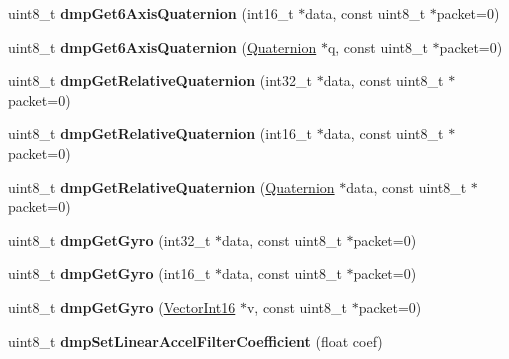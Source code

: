 \begin{DoxyCompactItemize}
\mbox{\label{classMPU6050_a9c074fce94329c3f41aa6cddc2080358}} 
uint8\+\_\+t {\bfseries dmp\+Get6\+Axis\+Quaternion} (int16\+\_\+t $\ast$data, const uint8\+\_\+t $\ast$packet=0)
\item 
\mbox{\label{classMPU6050_a2fff9f9904645926472a7527b20d2330}} 
uint8\+\_\+t {\bfseries dmp\+Get6\+Axis\+Quaternion} (\mbox{\hyperlink{classQuaternion}{Quaternion}} $\ast$q, const uint8\+\_\+t $\ast$packet=0)
\item 
\mbox{\label{classMPU6050_a355a874853887baea2e8152a218a1358}} 
uint8\+\_\+t {\bfseries dmp\+Get\+Relative\+Quaternion} (int32\+\_\+t $\ast$data, const uint8\+\_\+t $\ast$packet=0)
\item 
\mbox{\label{classMPU6050_ac74ebf94e4504dfe258d8c739d63d807}} 
uint8\+\_\+t {\bfseries dmp\+Get\+Relative\+Quaternion} (int16\+\_\+t $\ast$data, const uint8\+\_\+t $\ast$packet=0)
\item 
\mbox{\label{classMPU6050_ad1b10602a76de6a84365ff2c3e3ee69d}} 
uint8\+\_\+t {\bfseries dmp\+Get\+Relative\+Quaternion} (\mbox{\hyperlink{classQuaternion}{Quaternion}} $\ast$data, const uint8\+\_\+t $\ast$packet=0)
\item 
\mbox{\label{classMPU6050_a6625cf6f1ceb2e9c2503a590ade6686b}} 
uint8\+\_\+t {\bfseries dmp\+Get\+Gyro} (int32\+\_\+t $\ast$data, const uint8\+\_\+t $\ast$packet=0)
\item 
\mbox{\label{classMPU6050_a8cb79f053e00eb70b898be131b467748}} 
uint8\+\_\+t {\bfseries dmp\+Get\+Gyro} (int16\+\_\+t $\ast$data, const uint8\+\_\+t $\ast$packet=0)
\item 
\mbox{\label{classMPU6050_a97d9c59f863800ea8d804013d860ba08}} 
uint8\+\_\+t {\bfseries dmp\+Get\+Gyro} (\mbox{\hyperlink{classVectorInt16}{Vector\+Int16}} $\ast$v, const uint8\+\_\+t $\ast$packet=0)
\item 
\mbox{\label{classMPU6050_a7142bff552ab1e980cba38f97772eecd}} 
uint8\+\_\+t {\bfseries dmp\+Set\+Linear\+Accel\+Filter\+Coefficient} (float coef)
\item 
\mbox{\label{classMPU6050_aa36d05bce800803489ae4da91f63ed2d}} 

\end{DoxyCompactItemize}
